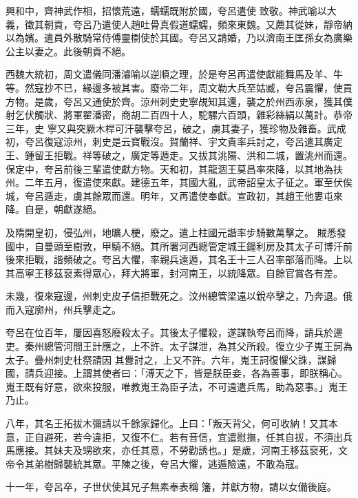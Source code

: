 \begin{pinyinscope}
 興和中，齊神武作相，招懷荒遠，蠕蠕既附於國，夸呂遣使
 致敬。神武喻以大義，徵其朝貢，夸呂乃遣使人趙吐骨真假道蠕蠕，頻來東魏。又薦其從妹，靜帝納以為嬪。遣員外散騎常侍傅靈檦使於其國。夸呂又請婚，乃以濟南王匡孫女為廣樂公主以妻之。此後朝貢不絕。



 西魏大統初，周文遣儀同潘濬喻以逆順之理，於是夸呂再遣使獻能舞馬及羊、牛等。然寇抄不已，緣邊多被其害。廢帝二年，周文勒大兵至姑臧，夸呂震懼，使貢方物。是歲，夸呂又通使於齊。涼州刺史史寧覘知其還，襲之於州西赤泉，獲其僕射乞伏觸狀、將軍翟潘密，商胡二百四十人，駝騾六百頭，雜彩絲絹以萬計。恭帝三年，史
 寧又與突厥木桿可汗襲擊夸呂，破之，虜其妻子，獲珍物及雜畜。武成初，夸呂復寇涼州，刺史是云寶戰沒。賀蘭祥、宇文貴率兵討之，夸呂遣其廣定王、鍾留王拒戰。祥等破之，廣定等遁走。又拔其洮陽、洪和二城，置洮州而還。保定中，夸呂前後三輩遣使獻方物。天和初，其龍涸王莫昌率來降，以其地為扶州。二年五月，復遣使來獻。建德五年，其國大亂，武帝詔皇太子征之。軍至伏俟城，夸呂遁走，虜其餘眾而還。明年，又再遣使奉獻。宣政初，其趙王他婁屯來降。自是，朝獻遂絕。



 及隋開皇初，侵弘州，地曠人梗，廢之。遣上柱國元諧率步騎數萬擊之。
 賊悉發國中，自曼頭至樹敦，甲騎不絕。其所署河西總管定城王鐘利房及其太子可博汗前後來拒戰，諧頻破之。夸呂大懼，率親兵遠遁，其名王十三人召率部落而降。上以其高寧王移茲裒素得眾心，拜大將軍，封河南王，以統降眾。自餘官賞各有差。



 未幾，復來寇邊，州刺史皮子信拒戰死之。汶州總管梁遠以銳卒擊之，乃奔退。俄而入寇廓州，州兵擊走之。



 夸呂在位百年，屢因喜怒廢殺太子。其後太子懼殺，遂謀執夸呂而降，請兵於邊吏。秦州總管河間王計應之，上不許。太子謀泄，為其父所殺。復立少子嵬王訶為太子。疊州刺史杜祭請因
 其釁討之，上又不許。六年，嵬王訶復懼父誅，謀歸國，請兵迎接。上謂其使者曰：「溥天之下，皆是朕臣妾，各為善事，即朕稱心。嵬王既有好意，欲來投服，唯教嵬王為臣子法，不可遠遣兵馬，助為惡事。」嵬王乃止。



 八年，其名王拓拔木彌請以千餘家歸化。上曰：「叛天背父，何可收納！又其本意，正自避死，若今違拒，又復不仁。若有音信，宜遣慰撫，任其自拔，不須出兵馬應接。其妹夫及甥欲來，亦任其意，不勞勸誘也。」是歲，河南王移茲裒死，文帝令其弟樹歸襲統其眾。平陳之後，夸呂大懼，逃遁險遠，不敢為寇。



 十一年，夸呂卒，子世伏使其兄子無素奉表稱
 籓，并獻方物，請以女備後庭。




\end{pinyinscope}
